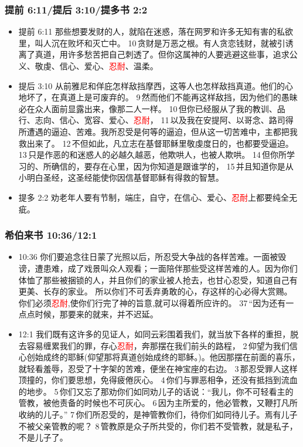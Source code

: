  

\subsubsection{提前 6:11/提后 3:10/提多书 2:2} 
\begin{itemize}[noitemsep]
\item 提前 6:11 那些想要发财的人，就陷在迷惑，落在网罗和许多无知有害的私欲里，叫人沉在败坏和灭亡中。 10 贪财是万恶之根。有人贪恋钱财，就被引诱离了真道，用许多愁苦把自己刺透了。但你这属神的人要逃避这些事，追求公义、敬虔、信心、爱心、\textcolor{red}{忍耐}、温柔。 
\item 提后 3:10 从前雅尼和佯庇怎样敌挡摩西，这等人也怎样敌挡真道。他们的心地坏了，在真道上是可废弃的。 9 然而他们不能再这样敌挡，因为他们的愚昧必在众人面前显露出来，像那二人一样。 10 但你已经服从了我的教训、品行、志向、信心、宽容、爱心、\textcolor{red}{忍耐}， 11 以及我在安提阿、以哥念、路司得所遭遇的逼迫、苦难。我所忍受是何等的逼迫，但从这一切苦难中，主都把我救出来了。 12 不但如此，凡立志在基督耶稣里敬虔度日的，也都要受逼迫。 13 只是作恶的和迷惑人的必越久越恶，他欺哄人，也被人欺哄。 14 但你所学习的、所确信的，要存在心里，因为你知道是跟谁学的， 15 并且知道你是从小明白圣经，这圣经能使你因信基督耶稣有得救的智慧。
\item 提多 2:2 劝老年人要有节制，端庄，自守，在信心、爱心、\textcolor{red}{忍耐}上都要纯全无疵。
\end{itemize}




\subsubsection{希伯来书 10:36/12:1} 
\begin{itemize}[noitemsep]
\item 10:36 你们要追念往日蒙了光照以后，所忍受大争战的各样苦难。一面被毁谤，遭患难，成了戏景叫众人观看；一面陪伴那些受这样苦难的人。因为你们体恤了那些被捆锁的人，并且你们的家业被人抢去，也甘心忍受，知道自己有更美、长存的家业。 所以你们不可丢弃勇敢的心，存这样的心必得大赏赐。你们必须\textcolor{red}{忍耐},使你们行完了神的旨意,就可以得着所应许的。 37 “因为还有一点点时候，那要来的就来，并不迟延。

\item 12:1 我们既有这许多的见证人，如同云彩围着我们，就当放下各样的重担，脱去容易缠累我们的罪，存心\textcolor{red}{忍耐}，奔那摆在我们前头的路程， 2 仰望为我们信心创始成终的耶稣(仰望那将真道创始成终的耶稣。)。他因那摆在前面的喜乐，就轻看羞辱，忍受了十字架的苦难，便坐在神宝座的右边。 3 那忍受罪人这样顶撞的，你们要思想，免得疲倦灰心。 4 你们与罪恶相争，还没有抵挡到流血的地步。 5 你们又忘了那劝你们如同劝儿子的话说：“我儿，你不可轻看主的管教，被他责备的时候也不可灰心。 6 因为主所爱的，他必管教，又鞭打凡所收纳的儿子。” 7 你们所忍受的，是神管教你们，待你们如同待儿子。焉有儿子不被父亲管教的呢？ 8 管教原是众子所共受的，你们若不受管教，就是私子，不是儿子了。
\end{itemize}



